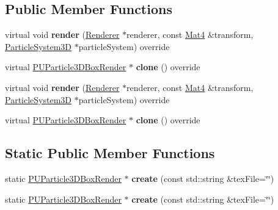 \subsection*{Public Member Functions}
\begin{DoxyCompactItemize}
\item 
\mbox{\label{classPUParticle3DBoxRender_ac7a0061805e37541ce5f69795198688b}} 
virtual void {\bfseries render} (\hyperlink{classRenderer}{Renderer} $\ast$renderer, const \hyperlink{classMat4}{Mat4} \&transform, \hyperlink{classParticleSystem3D}{Particle\+System3D} $\ast$particle\+System) override
\item 
\mbox{\label{classPUParticle3DBoxRender_a9f0fa6afc07c959b14e0bd24789355e7}} 
virtual \hyperlink{classPUParticle3DBoxRender}{P\+U\+Particle3\+D\+Box\+Render} $\ast$ {\bfseries clone} () override
\item 
\mbox{\label{classPUParticle3DBoxRender_a6b697a3d7ccdb02c8770ff6712526134}} 
virtual void {\bfseries render} (\hyperlink{classRenderer}{Renderer} $\ast$renderer, const \hyperlink{classMat4}{Mat4} \&transform, \hyperlink{classParticleSystem3D}{Particle\+System3D} $\ast$particle\+System) override
\item 
\mbox{\label{classPUParticle3DBoxRender_aa731e11567e8cff64cf168dfe8abbee6}} 
virtual \hyperlink{classPUParticle3DBoxRender}{P\+U\+Particle3\+D\+Box\+Render} $\ast$ {\bfseries clone} () override
\end{DoxyCompactItemize}
\subsection*{Static Public Member Functions}
\begin{DoxyCompactItemize}
\item 
\mbox{\label{classPUParticle3DBoxRender_a2694f077891799e424410643ca3cfbd8}} 
static \hyperlink{classPUParticle3DBoxRender}{P\+U\+Particle3\+D\+Box\+Render} $\ast$ {\bfseries create} (const std\+::string \&tex\+File=\char`\"{}\char`\"{})
\item 
\mbox{\label{classPUParticle3DBoxRender_a1efb856f6cd8fad45661f2232d7fe4f5}} 
static \hyperlink{classPUParticle3DBoxRender}{P\+U\+Particle3\+D\+Box\+Render} $\ast$ {\bfseries create} (const std\+::string \&tex\+File=\char`\"{}\char`\"{})
\end{DoxyCompactItemize}
